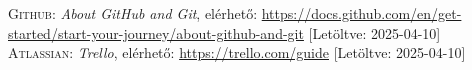 \documentclass[
]{thesis-ekf}
\theoremstyle{definition}
\theoremstyle{remark}
\begin{document}
\begin{thebibliography}{2}
\textsc{Github}: \emph{About GitHub and Git}, elérhető:
\url{https://docs.github.com/en/get-started/start-your-journey/about-github-and-git} [Letöltve: 2025-04-10]\\
\textsc{Atlassian}: \emph{Trello}, elérhető:
\url{https://trello.com/guide} [Letöltve: 2025-04-10]\\
\end{thebibliography}


\end{document}
